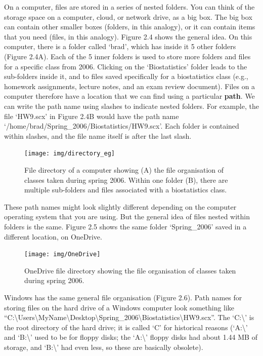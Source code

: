 \documentclass[
  openany]{scrbook}
\begin{document}
On a computer, files are stored in a series of nested folders.
You can think of the storage space on a computer, cloud, or network drive, as a big box.
The big box can contain other smaller boxes (folders, in this analogy), or it can contain items that you need (files, in this analogy).
Figure 2.4 shows the general idea.
On this computer, there is a folder called `brad', which has inside it 5 other folders (Figure 2.4A).
Each of the 5 inner folders is used to store more folders and files for a specific class from 2006.
Clicking on the `Biostatistics' folder leads to the sub-folders inside it, and to files saved specifically for a biostatistics class (e.g., homework assignments, lecture notes, and an exam review document).
Files on a computer therefore have a location that we can find using a particular \textbf{path}.
We can write the path name using slashes to indicate nested folders.
For example, the file `HW9.scx' in Figure 2.4B would have the path name `/home/brad/Spring\_2006/Biostatistics/HW9.scx'.
Each folder is contained within slashes, and the file name itself is after the last slash.

\begin{figure}
\texttt{[image: img/directory\_eg]} \caption{File directory of a computer showing (A) the file organisation of classes taken during spring 2006. Within one folder (B), there are multiple sub-folders and files associated with a biostatistics class.}\label{fig:unnamed-chunk-6}
\end{figure}

These path names might look slightly different depending on the computer operating system that you are using.
But the general idea of files nested within folders is the same.
Figure 2.5 shows the same folder `Spring\_2006' saved in a different location, on OneDrive.

\begin{figure}
\texttt{[image: img/OneDrive]} \caption{OneDrive file directory showing the file organisation of classes taken during spring 2006.}\label{fig:unnamed-chunk-7}
\end{figure}

Windows has the same general file organisation (Figure 2.6).
Path names for storing files on the hard drive of a Windows computer look something like ``C:\textbackslash Users\textbackslash MyName\textbackslash Desktop\textbackslash Spring\_2006\textbackslash Biostatistics\textbackslash HW9.scx''.
The `C:\textbackslash{}' is the root directory of the hard drive; it is called `C' for historical reasons (`A:\textbackslash{}' and `B:\textbackslash{}' used to be for floppy disks; the `A:\textbackslash{}' floppy disks had about 1.44 MB of storage, and `B:\textbackslash{}' had even less, so these are basically obsolete).
\end{document}

